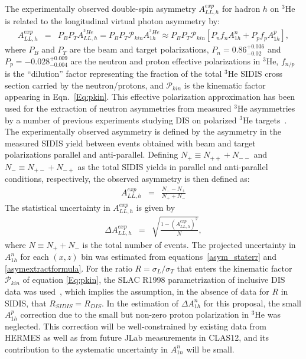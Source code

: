 The experimentally observed double-spin asymmetry $A_{LL,h}^{exp}$ for hadron $h$ on $^3$He is related to the longitudinal virtual photon asymmetry by:
\begin{eqnarray}
  A_{LL,h}^{exp} &=& P_B P_T A_{LL,h}^{^3He} = P_B P_T \mathcal{P}_{kin} A_{1h}^{^3He} \approx P_B P_T \mathcal{P}_{kin} \left[P_n f_n A_{1h}^n + P_p f_p A_{1h}^p \right], \label{asymextractformula}
\end{eqnarray}
where $P_B$ and $P_T$ are the beam and target polarizations, $P_n = 0.86_{-0.02}^{+0.036}$ and $P_p = -0.028_{-0.004}^{+0.009}$ are the neutron and proton effective polarizations in $^3$He, $f_{n/p}$ is the ``dilution'' factor representing the fraction of the total $^3$He SIDIS cross section carried by the neutron/protons, and $\mathcal{P}_{kin}$ is the kinematic factor appearing in Eqn.~\eqref{Eq:pkin}. This effective polarization approximation has been used for the extraction of neutron asymmetries from measured $^3$He asymmetries by a number of previous experiments studying DIS on polarized $^3$He targets~\cite{E06010_AUT_PRL,E06010_ALT_PRL,A1N_PRL}. The experimentally observed asymmetry is defined by the asymmetry in the measured SIDIS yield between events obtained with beam and target polarizations parallel and anti-parallel. Defining $N_+ \equiv N_{++} + N_{--}$ and $N_{-} \equiv N_{+-} + N_{-+}$ as the total SIDIS yields in parallel and anti-parallel conditions, respectively, the observed asymmetry is then defined as:
\begin{eqnarray}
  A_{LL,h}^{exp} &=& \frac{N_- - N_+}{N_+ + N_-}
\end{eqnarray}
The statistical uncertainty in $A_{LL,h}^{exp}$ is given by 
\begin{eqnarray}
  \Delta A_{LL,h}^{exp} &=& \sqrt{\frac{1-(A_{LL,h}^{exp})^2}{N}}, \label{asym_staterr}
\end{eqnarray}
where $N \equiv N_+ + N_-$ is the total number of events. The projected uncertainty in $A_{1h}^n$ for each $(x,z)$ bin was estimated from equations~\eqref{asym_staterr} and \eqref{asymextractformula}. For the ratio $R = \sigma_L/\sigma_T$ that enters the kinematic factor $\mathcal{P}_{kin}$ of equation \eqref{Eq:pkin}, the SLAC R1998 parametrization of inclusive DIS data was used~\cite{SLAC_R1998}, which implies the assumption, in the absence of data for $R$ in SIDIS, that $R_{SIDIS} = R_{DIS}$. In the estimation of $\Delta A_{1h}^n$ for this proposal, the small $A_{1h}^p$ correction due to the small but non-zero proton polarization in $^3$He was neglected. This correction will be well-constrained by existing data from HERMES as well as from future JLab measurements in CLAS12, and its contribution to the systematic uncertainty in $A_{1n}^n$ will be small.


